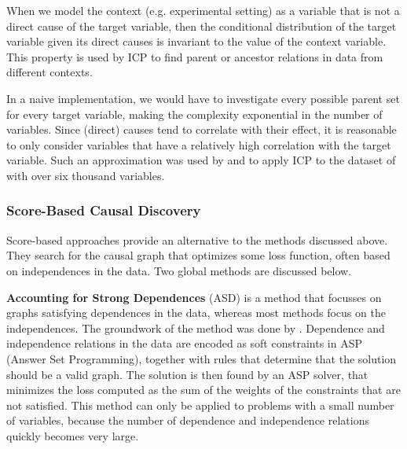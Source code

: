 When we model the context (e.g. experimental setting) as a variable that is not a direct cause of the target variable, then the conditional distribution of the target variable given its direct causes is invariant to the value of the context variable. This property is used by ICP to find parent or ancestor relations in data from different contexts. 

In a naive implementation, we would have to investigate every possible parent set for every target variable, making the complexity exponential in the number of variables. Since (direct) causes tend to correlate with their effect, it is reasonable to only consider variables that have a relatively high correlation with the target variable. Such an approximation was used by \citet{peters2016causal} and \citet{meinshausen2016methods} to apply ICP to the dataset of \citet{kemmeren2014large} with over six thousand variables.

    
\subsubsection{Score-Based Causal Discovery}

Score-based approaches provide an alternative to the methods discussed above. They search for the causal graph that optimizes some loss function, often based on independences in the data. Two global methods are discussed below.

\textbf{Accounting for Strong Dependences} (ASD) is a method that focusses on graphs satisfying dependences in the data, whereas most methods focus on the independences. The groundwork of the method was done by \citet{hyttinen2014constraint}. Dependence and independence relations in the data are encoded as soft constraints in ASP (Answer Set Programming), together with rules that determine that the solution should be a valid graph. The solution is then found by an ASP solver, that minimizes the loss computed as the sum of the weights of the constraints that are not satisfied. This method can only be applied to problems with a small number of variables, because the number of dependence and independence relations quickly becomes very large.

